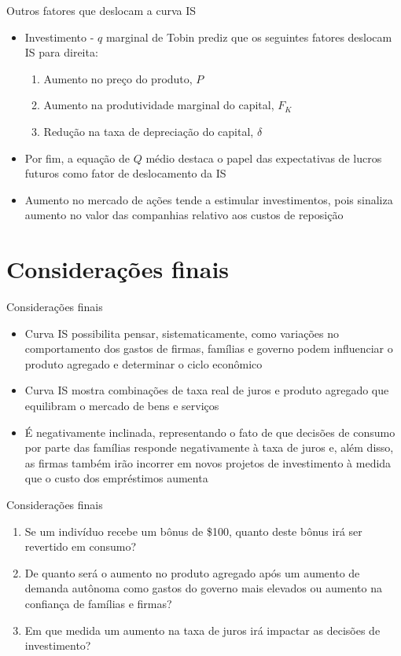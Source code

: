 \documentclass[10pt]{beamer}
\begin{document}
\begin{frame}
    {Outros fatores que deslocam a curva IS}
    \begin{itemize}
        \item Investimento - $q$ marginal de Tobin prediz que os seguintes fatores deslocam IS para direita:\bigskip
        \begin{enumerate}
            \item Aumento no preço do produto, $P$\medskip
            \item Aumento na produtividade marginal do capital, $F_K$\medskip
            \item Redução na taxa de depreciação do capital, $\delta$\bigskip
        \end{enumerate}
        \item Por fim, a equação de $Q$ médio destaca o papel das expectativas de lucros futuros como fator de deslocamento da IS\bigskip
        \item Aumento no mercado de ações tende a estimular investimentos, pois sinaliza aumento no valor das companhias relativo aos custos de reposição
    \end{itemize}
\end{frame}

\section{Considerações finais}
\begin{frame}
    {Considerações finais}
    \begin{itemize}
        \item Curva IS possibilita pensar, sistematicamente, como variações no comportamento dos gastos de firmas, famílias e governo podem influenciar o produto agregado e determinar o ciclo econômico\bigskip
        \item Curva IS mostra combinações de taxa real de juros e produto agregado que equilibram o mercado de bens e serviços\bigskip
        \item É negativamente inclinada, representando o fato de que decisões de consumo por parte das famílias responde negativamente à taxa de juros e, além disso, as firmas também irão incorrer em novos projetos de investimento à medida que o custo dos empréstimos aumenta
    \end{itemize}
\end{frame}

\begin{frame}
    {Considerações finais}
    \begin{enumerate}
        \item Se um indivíduo recebe um bônus de \$100, quanto deste bônus irá ser revertido em consumo?\bigskip
        \item De quanto será o aumento no produto agregado após um aumento de demanda autônoma como gastos do governo mais elevados ou aumento na confiança de famílias e firmas?\bigskip
        \item Em que medida um aumento na taxa de juros irá impactar as decisões de investimento?
    \end{enumerate}
\end{frame}
\end{document}
